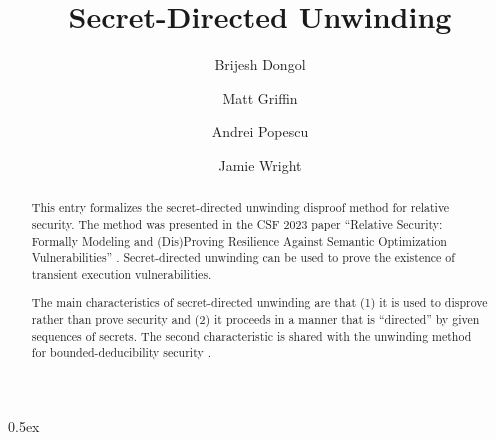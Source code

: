 \documentclass[11pt,a4paper]{article}
\begin{document}
\title{Secret-Directed Unwinding}
\author{Brijesh Dongol \and Matt Griffin \and Andrei Popescu \and Jamie Wright}
\maketitle

\begin{abstract}
	This entry formalizes the secret-directed unwinding disproof method for relative security. 
	The method was presented in the CSF 2023 paper 
	``Relative Security: Formally Modeling and (Dis)Proving Resilience Against Semantic Optimization Vulnerabilities'' \cite{relsec-CSF2023}. Secret-directed unwinding can be used to prove the existence of transient execution vulnerabilities. 
	
	The main characteristics of secret-directed unwinding are that (1) it is used to disprove rather than prove security and (2) it proceeds in a manner that is ``directed'' by given sequences of secrets. The second characteristic is shared with the unwinding method for bounded-deducibility security \cite{BDsecurity-ITP2021}.  
\end{abstract}

\tableofcontents


 
\parindent 0pt\parskip 0.5ex





\end{document}
